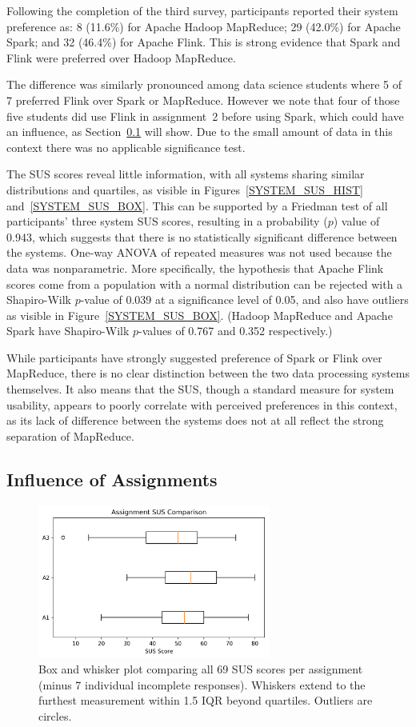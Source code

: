  Following the completion of the third survey, participants reported their system preference as: 8 (11.6\%) for Apache Hadoop MapReduce; 29 (42.0\%) for Apache Spark; and 32 (46.4\%) for Apache Flink. This is strong evidence that Spark and Flink were preferred over Hadoop MapReduce.
  
  The difference was similarly pronounced among data science students where 5 of 7 preferred Flink over Spark or MapReduce. However we note that four of those five students did use Flink in assignment~2 before using Spark, which could have an influence, as Section~\ref{ASSIGNMENT_INFLUENCE} will show. Due to the small amount of data in this context there was no applicable significance test. 
  
  The SUS scores reveal little information, with all systems sharing similar distributions and quartiles, as visible in Figures~\ref{SYSTEM_SUS_HIST} and~\ref{SYSTEM_SUS_BOX}. This can be supported by a Friedman test of all participants' three system SUS scores, resulting in a probability ($p$) value of 0.943, which suggests that there is no statistically significant difference between the systems. One-way ANOVA of repeated measures was not used because the data was nonparametric. More specifically, the hypothesis that Apache Flink scores come from a population with a normal distribution can be rejected with a Shapiro-Wilk $p$-value of 0.039 at a significance level of 0.05, and also have outliers as visible in Figure~\ref{SYSTEM_SUS_BOX}. (Hadoop MapReduce and Apache Spark have Shapiro-Wilk $p$-values of 0.767 and 0.352 respectively.)

  While participants have strongly suggested preference of Spark or Flink over MapReduce, there is no clear distinction between the two data processing systems themselves. It also means that the SUS, though a standard measure for system usability, appears to poorly correlate with perceived preferences in this context, as its lack of difference between the systems does not at all reflect the strong separation of MapReduce.


\subsection{Influence of Assignments}
\label{ASSIGNMENT_INFLUENCE}
  
  \begin{figure}[ht]
    \centering
    \includegraphics[width=3in]{./figs/assignment-sus-comparison.png}
    \caption{Box and whisker plot comparing all 69 SUS scores per assignment (minus 7 individual incomplete responses). Whiskers extend to the furthest measurement within 1.5 IQR beyond quartiles. Outliers are circles.}
    \label{ASSIGNMENT_SUS}
  \end{figure}
  
